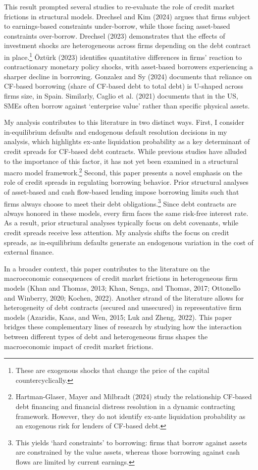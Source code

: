 \documentclass[12pt]{article}
\begin{document}
This result prompted several studies to re-evaluate the role of credit market frictions in structural models. Drechsel and Kim (2024) argues that firms subject to earnings-based constraints under-borrow, while those facing asset-based constraints over-borrow. Drechsel (2023) demonstrates that the effects of investment shocks are heterogeneous across firms depending on the debt contract in place.\footnote{These are exogenous shocks that change the price of the capital countercyclically.} Öztürk (2023) identifies quantitative differences in firms' reaction to contractionary monetary policy shocks, with asset-based borrowers experiencing a sharper decline in borrowing. Gonzalez and Sy (2024) documents that reliance on CF-based borrowing (share of CF-based debt to total debt) is U-shaped across firms size, in Spain. Similarly, Caglio et al. (2021) documents that in the US, SMEs often borrow against `enterprise value' rather than specific physical assets.

My analysis contributes to this literature in two distinct ways. First, I consider in-equilibrium defaults and endogenous default resolution decisions in my analysis, which highlights ex-ante liquidation probability as a key determinant of credit spreads for CF-based debt contracts. While previous studies have alluded to the importance of this factor, it has not yet been examined in a structural macro model framework.\footnote{Hartman-Glaser, Mayer and Milbradt (2024) study the relationship CF-based debt financing and financial distress resolution in a dynamic contracting framework. However, they do not identify ex-ante liquidation probability as an exogenous risk for lenders of CF-based debt.} Second, this paper presents a novel emphasis on the role of credit spreads in regulating borrowing behavior. Prior structural analyses of asset-based and cash flow-based lending impose borrowing limits such that firms always choose to meet their debt obligations.\footnote{This yields `hard constraints' to borrowing: firms that borrow against assets are constrained by the value assets, whereas those borrowing against cash flows are limited by current earnings.} Since debt contracts are always honored in these models, every firm faces the same risk-free interest rate. As a result, prior structural analyses typically focus on debt covenants, while credit spreads receive less attention. My analysis shifts the focus on credit spreads, as in-equilibrium defaults generate an endogenous variation in the cost of external finance. 

In a broader context, this paper contributes to the literature on the macroeconomic consequences of credit market frictions in heterogeneous firm models (Khan and Thomas, 2013; Khan, Senga, and Thomas, 2017; Ottonello and Winberry, 2020; Kochen, 2022). Another strand of the literature allows for heterogeneity of debt contracts (secured and unsecured) in representative firm models (Azaridis, Kaas, and Wen, 2015; Luk and Zheng, 2022). This paper bridges these complementary lines of research by studying how the interaction between different types of debt and heterogeneous firms shapes the macroeconomic impact of credit market frictions.
\end{document}
